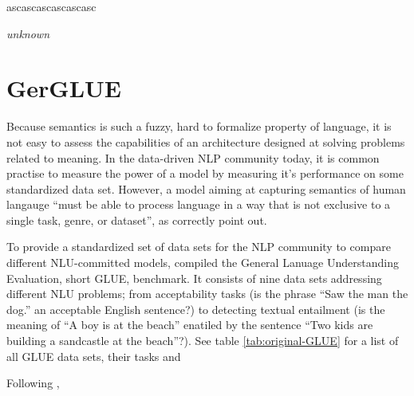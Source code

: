 \label{chap:3_datasets}

\epigraph{ascascascascascasc}{\textit{unknown}}

\section{GerGLUE}

Because semantics is such a fuzzy, hard to formalize property of language, it is not easy to
assess the capabilities of an architecture designed at solving problems related to meaning. In
the data-driven NLP community today, it is common practise to measure the {\color{red} power of
a model} by measuring it's performance on some standardized data set. However, a model aiming at
capturing semantics of human langauge ``must be able to process language in a way that is not
exclusive to a single task, genre, or dataset'', as \cite{wang2018glue} correctly point out.

To provide a standardized set of data sets for the NLP community to compare different NLU-committed
models, \citeauthor{wang2018glue} compiled the General Lanuage Understanding Evaluation, short
GLUE, benchmark. It consists of nine data sets addressing different NLU problems; from acceptability
tasks (is the phrase ``Saw the man the dog.'' an acceptable English sentence?) to detecting
textual entailment (is the meaning of ``A boy is at the beach'' enatiled by the sentence
``Two kids are building a sandcastle at the beach''?). See table \ref{tab:original-GLUE} for
a list of all GLUE data sets, their tasks and




Following \cite{wang2018glue},

